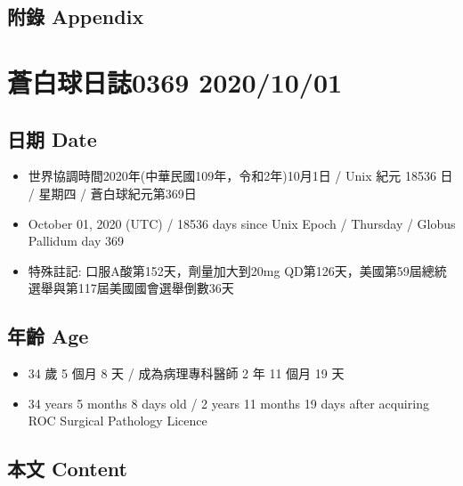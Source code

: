 \documentclass[
]{article}
\providecommand{\tightlist}{%
  \setlength{\itemsep}{0pt}\setlength{\parskip}{0pt}}
\begin{document}
\hypertarget{ux9644ux9304-appendix-27}{%
\subsection{附錄 Appendix}\label{ux9644ux9304-appendix-27}}

\hypertarget{ux84bcux767dux7403ux65e5ux8a8c0369-20201001}{%
\section{蒼白球日誌0369
2020/10/01}\label{ux84bcux767dux7403ux65e5ux8a8c0369-20201001}}

\hypertarget{ux65e5ux671f-date-28}{%
\subsection{日期 Date}\label{ux65e5ux671f-date-28}}

\begin{itemize}
\tightlist
\item
  世界協調時間2020年(中華民國109年，令和2年)10月1日 / Unix 紀元 18536 日
  / 星期四 / 蒼白球紀元第369日
\item
  October 01, 2020 (UTC) / 18536 days since Unix Epoch / Thursday /
  Globus Pallidum day 369
\item
  特殊註記: 口服A酸第152天，劑量加大到20mg
  QD第126天，美國第59屆總統選舉與第117屆美國國會選舉倒數36天
\end{itemize}

\hypertarget{ux5e74ux9f61-age-28}{%
\subsection{年齡 Age}\label{ux5e74ux9f61-age-28}}

\begin{itemize}
\tightlist
\item
  34 歲 5 個月 8 天 / 成為病理專科醫師 2 年 11 個月 19 天
\item
  34 years 5 months 8 days old / 2 years 11 months 19 days after
  acquiring ROC Surgical Pathology Licence
\end{itemize}

\hypertarget{ux672cux6587-content-28}{%
\subsection{本文 Content}\label{ux672cux6587-content-28}}
\end{document}
